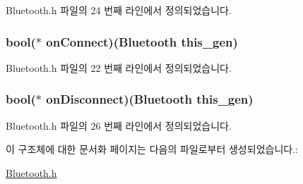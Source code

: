 Bluetooth.\-h 파일의 24 번째 라인에서 정의되었습니다.

\hypertarget{struct___bluetooth_a02ed8ce853ef7914c2d0663ddc85bf71}{
\subsubsection[{on\-Connect}]{\setlength{\rightskip}{0pt plus 5cm}bool($\ast$  on\-Connect)({\bf Bluetooth} this\-\_\-gen)}}\label{struct___bluetooth_a02ed8ce853ef7914c2d0663ddc85bf71}


Bluetooth.\-h 파일의 22 번째 라인에서 정의되었습니다.

\hypertarget{struct___bluetooth_a73fc8eb303afc5b6d5e9188e623f8d3d}{
\subsubsection[{on\-Disconnect}]{\setlength{\rightskip}{0pt plus 5cm}bool($\ast$  on\-Disconnect)({\bf Bluetooth} this\-\_\-gen)}}\label{struct___bluetooth_a73fc8eb303afc5b6d5e9188e623f8d3d}


Bluetooth.\-h 파일의 26 번째 라인에서 정의되었습니다.



이 구조체에 대한 문서화 페이지는 다음의 파일로부터 생성되었습니다.\-:\begin{DoxyCompactItemize}
\item 
\hyperlink{_bluetooth_8h}{Bluetooth.\-h}\end{DoxyCompactItemize}
